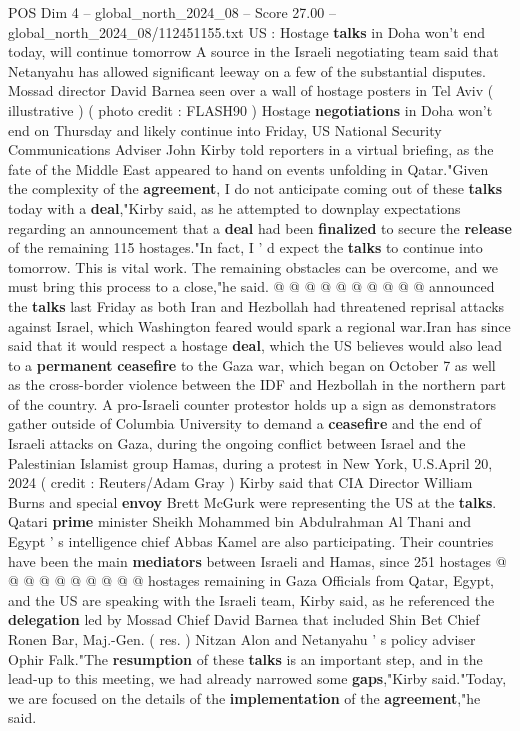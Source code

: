 \begin{textsample}{POS Dim 4 – global\_north\_2024\_08 – Score 27.00 – global\_north\_2024\_08/112451155.txt}  \label{ex:f4_pos_152}
US : Hostage \textbf{talks} in Doha won't end today, will continue tomorrow A source in the Israeli negotiating team said that Netanyahu has allowed significant leeway on a few of the substantial disputes.
Mossad director David Barnea seen over a wall of hostage posters in Tel Aviv ( illustrative ) ( photo credit : FLASH90 ) Hostage \textbf{negotiations} in Doha won't end on Thursday and likely continue into Friday, US National Security Communications Adviser John Kirby told reporters in a virtual briefing, as the fate of the Middle East appeared to hand on events unfolding in Qatar."Given the complexity of the \textbf{agreement}, I do not anticipate coming out of these \textbf{talks} today with a \textbf{deal},"Kirby said, as he attempted to downplay expectations regarding an announcement that a \textbf{deal} had been \textbf{finalized} to secure the \textbf{release} of the remaining 115 hostages."In fact, I ' d expect the \textbf{talks} to continue into tomorrow.
This is vital work.
The remaining obstacles can be overcome, and we must bring this process to a close,"he said. @ @ @ @ @ @ @ @ @ @ announced the \textbf{talks} last Friday as both Iran and Hezbollah had threatened reprisal attacks against Israel, which Washington feared would spark a regional war.Iran has since said that it would respect a hostage \textbf{deal}, which the US believes would also lead to a \textbf{permanent} \textbf{ceasefire} to the Gaza war, which began on October 7 as well as the cross-border violence between the IDF and Hezbollah in the northern part of the country.
A pro-Israeli counter protestor holds up a sign as demonstrators gather outside of Columbia University to demand a \textbf{ceasefire} and the end of Israeli attacks on Gaza, during the ongoing conflict between Israel and the Palestinian Islamist group Hamas, during a protest in New York, U.S.April 20, 2024 ( credit : Reuters/Adam Gray ) Kirby said that CIA Director William Burns and special \textbf{envoy} Brett McGurk were representing the US at the \textbf{talks}.
Qatari \textbf{prime} minister Sheikh Mohammed bin Abdulrahman Al Thani and Egypt ' s intelligence chief Abbas Kamel are also participating.
Their countries have been the main \textbf{mediators} between Israeli and Hamas, since 251 hostages @ @ @ @ @ @ @ @ @ @ hostages remaining in Gaza Officials from Qatar, Egypt, and the US are speaking with the Israeli team, Kirby said, as he referenced the \textbf{delegation} led by Mossad Chief David Barnea that included Shin Bet Chief Ronen Bar, Maj.-Gen. ( res. ) Nitzan Alon and Netanyahu ' s policy adviser Ophir Falk."The \textbf{resumption} of these \textbf{talks} is an important step, and in the lead-up to this meeting, we had already narrowed some \textbf{gaps},"Kirby said."Today, we are focused on the details of the \textbf{implementation} of the \textbf{agreement},"he said.

\end{textsample}
